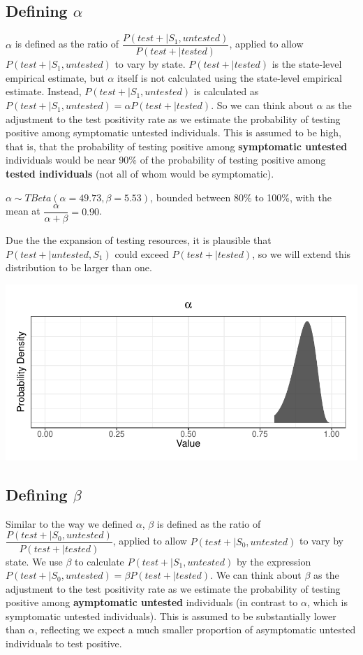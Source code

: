 \documentclass[12pt,twoside]{smiththesis}
\begin{document}
\hypertarget{defining-alpha}{%
\subsection{\texorpdfstring{Defining \(\alpha\)}{Defining \textbackslash alpha}}\label{defining-alpha}}

\(\alpha\) is defined as the ratio of \(\dfrac{P(test + |S_1, untested)}{P(test+|tested)}\), applied to allow \(P(test + |S_1, untested)\) to vary by state. \(P(test+|tested)\) is the state-level empirical estimate, but \(\alpha\) itself is not calculated using the state-level empirical estimate. Instead, \(P(test+|S_1, untested)\) is calculated as \(P(test+|S_1, untested) =\alpha P(test+|tested)\). So we can think about \(\alpha\) as the adjustment to the test positivity rate as we estimate the probability of testing positive among symptomatic untested individuals. This is assumed to be high, that is, that the probability of testing positive among \textbf{symptomatic untested} individuals would be near 90\% of the probability of testing positive among \textbf{tested individuals} (not all of whom would be symptomatic).

\(\alpha \sim TBeta(\alpha = 49.73, \beta = 5.53)\), bounded between 80\% to 100\%, with the mean at \(\dfrac{\alpha}{\alpha + \beta} = 0.90\).

Due the the expansion of testing resources, it is plausible that \(P(test +|untested,S_1)\) could exceed \(P(test+|tested)\), so we will extend this distribution to be larger than one.
\begin{center}\includegraphics[width=0.5\linewidth]{thesis_files/figure-latex/unnamed-chunk-53-1} \end{center}

\hypertarget{defining-beta}{%
\subsection{\texorpdfstring{Defining \(\beta\)}{Defining \textbackslash beta}}\label{defining-beta}}

Similar to the way we defined \(\alpha\), \(\beta\) is defined as the ratio of \(\dfrac{P(test + |S_0, untested)}{P(test+|tested)}\), applied to allow \(P(test + |S_0, untested)\) to vary by state. We use \(\beta\) to calculate \(P(test+|S_1, untested)\) by the expression \(P(test+|S_0, untested) =\beta P(test+|tested)\). We can think about \(\beta\) as the adjustment to the test positivity rate as we estimate the probability of testing positive among \textbf{aymptomatic untested} individuals (in contrast to \(\alpha\), which is symptomatic untested individuals). This is assumed to be substantially lower than \(\alpha\), reflecting we expect a much smaller proportion of asymptomatic untested individuals to test positive.
\end{document}
